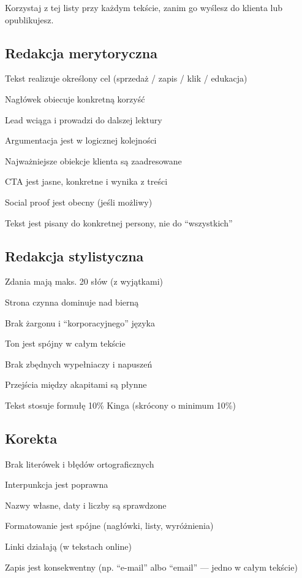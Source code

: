 \documentclass[
  12pt,
  a4paper,
  twoside,
  openright,
  12pt,
  DIV=12,
  BCOR=12mm]{scrbook}
\begin{document}
Korzystaj z tej listy przy każdym tekście, zanim go wyślesz do klienta
lub opublikujesz.

\subsection{Redakcja merytoryczna}\label{redakcja-merytoryczna}

\begin{checklist}
  \item Tekst realizuje określony cel (sprzedaż / zapis / klik / edukacja)
  \item Nagłówek obiecuje konkretną korzyść
  \item Lead wciąga i prowadzi do dalszej lektury
  \item Argumentacja jest w logicznej kolejności
  \item Najważniejsze obiekcje klienta są zaadresowane
  \item CTA jest jasne, konkretne i wynika z treści
  \item Social proof jest obecny (jeśli możliwy)
  \item Tekst jest pisany do konkretnej persony, nie do ``wszystkich''
\end{checklist}

\subsection{Redakcja stylistyczna}\label{redakcja-stylistyczna}

\begin{checklist}
  \item Zdania mają maks. 20 słów (z wyjątkami)
  \item Strona czynna dominuje nad bierną
  \item Brak żargonu i ``korporacyjnego'' języka
  \item Ton jest spójny w całym tekście
  \item Brak zbędnych wypełniaczy i napuszeń
  \item Przejścia między akapitami są płynne
  \item Tekst stosuje formułę 10\% Kinga (skrócony o minimum 10\%)
\end{checklist}

\subsection{Korekta}\label{korekta}

\begin{checklist}
  \item Brak literówek i błędów ortograficznych
  \item Interpunkcja jest poprawna
  \item Nazwy własne, daty i liczby są sprawdzone
  \item Formatowanie jest spójne (nagłówki, listy, wyróżnienia)
  \item Linki działają (w tekstach online)
  \item Zapis jest konsekwentny (np. ``e-mail'' albo ``email'' --- jedno w całym tekście)
\end{checklist}
\end{document}
